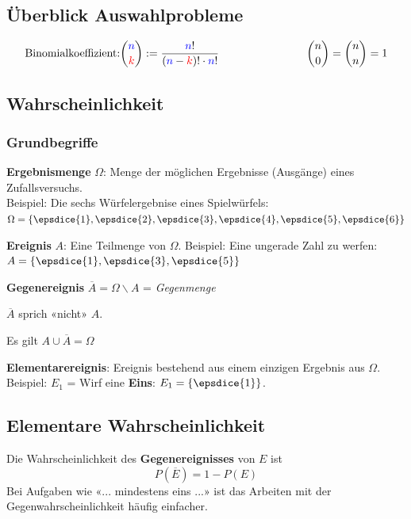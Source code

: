 \subsection*{Überblick Auswahlprobleme}
$$\textrm{Binomialkoeffizient:} {{\color{blue}n}\choose {\color{red}k}} :=\frac{{\color{blue}n}!}{({\color{blue}n}-{\color{red}k})!\cdot {\color{blue}n}!}\phantom{etwas Platz lassen} {n\choose 0}= {n\choose n}= 1$$

\hrulefill



\begin{multicols}{2}


\subsection*{Wahrscheinlichkeit}
\subsubsection*{Grundbegriffe}

\textbf{Ergebnismenge} $\Omega$: Menge der möglichen Ergebnisse
(Ausgänge) eines Zufallsversuchs.\\
Beispiel: Die sechs Würfelergebnise
eines Spielwürfels: $\Omega = \left\{\epsdice{1}, \epsdice{2}, \epsdice{3}, \epsdice{4}, \epsdice{5}, \epsdice{6}\right\}$

\textbf{Ereignis} $A$: Eine Teilmenge von $\Omega$. Beispiel: Eine
ungerade Zahl zu werfen: $A  = \left\{\epsdice{1}, \epsdice{3}, \epsdice{5}\right\}$

\textbf{Gegenereignis} $\overline{A} = \Omega \backslash A$ =
\textit{Gegenmenge}

$\overline{A}$ sprich «nicht» $A$.

Es gilt $A \cup \overline{A} = \Omega$

\textbf{Elementarereignis}: Ereignis bestehend aus einem einzigen
Ergebnis aus $\Omega$. Beispiel: $E_1$ = Wirf eine \textbf{Eins}: $E_1
= \left\{\epsdice{1}\right\}$.

\forceCB
\subsection*{Elementare Wahrscheinlichkeit}
Die Wahrscheinlichkeit des \textbf{Gegenereignisses} von $E$ ist
$$P(\overline{E}) = 1- P(E)$$
Bei Aufgaben wie «... mindestens eins ...» ist das Arbeiten mit der
Gegenwahrscheinlichkeit häufig einfacher.


\end{multicols}
